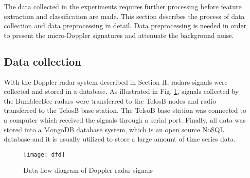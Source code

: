 The data collected in the experiments requires further processing before feature extraction and classification are made. This section describes the process of data collection and data preprocessing in detail. Data preprocessing is needed in order to present the micro-Doppler signatures and attenuate the background noise.
\subsection{Data collection}
With the Doppler radar system described in Section II, radars signals were collected and stored in a database. As illustrated in Fig. \ref{fig_dfd}, signals collected by the BumbleeBee radars were transferred to the TelosB nodes and radio transferred to the TelosB base station. The TelsoB base station was connected to a computer which received the signals through a serial port. Finally, all data was stored into a MongoDB database system, which is an open source NoSQL database and it is usually utilized to store a large amount of time series data.
\begin{figure}[h]
\centering
\texttt{[image: dfd]}
\caption{Data flow diagram of Doppler radar signals}
\label{fig_dfd}
\end{figure}

